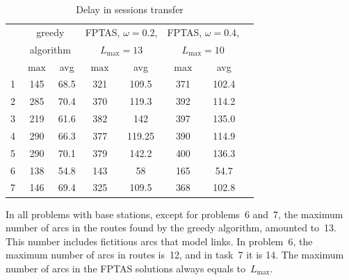 \documentclass{ifacconf}
\begin{document}
\begin{table}
\caption{Delay in sessions transfer} \label{tabl:Delay}
 \centering
\begin{tabular}{|c|c|c|c|c|c|c|c|}
\hline
 { } &\multicolumn{2}{|c|}{greedy}& \multicolumn{2}{|c|}{FPTAS, $\omega=0.2$,}&  \multicolumn{2}{|c|}{FPTAS, $\omega=0.4$,}\\
 {  } &\multicolumn{2}{|c|}{algorithm}& \multicolumn{2}{|c|}{$L_{\max}=13$}& \multicolumn{2}{|c|}{$L_{\max}=10$}\\
\hline
 &        $\max$ & avg &  $\max$ & avg &  $\max$ & avg\\
\hline 
1  & 145 & 68.5 & 321 & 109.5& 371 & 102.4\\
2     & 285 & 70.4 &  370   & 119.3 &392   & 114.2\\
3& 219 & 61.6 & 382  &  142 & 397   &    135.0 \\
4&            290 & 66.3 & 377   &  119.25 & 390    &  114.9\\
5& 290 & 70.1 & 379  &   142.2 & 400   &   136.3\\
6 & 138 & 54.8   & 143  &   58 & 165   &    54.7\\
7& 146& 69.4  &325  & 109.5 &368    & 102.8\\
 \hline
\end{tabular}
\end{table}


In all problems with base stations, except for problems~6 and~7,
the maximum number of arcs in the routes found by the greedy algorithm,
amounted to~13. This number includes fictitious arcs that model
links.
In problem~6, the maximum number of arcs in routes is~12, and in
task~7 it is 14. The maximum number of arcs in the FPTAS solutions always equals to~$L_{\max}$.
\end{document}
